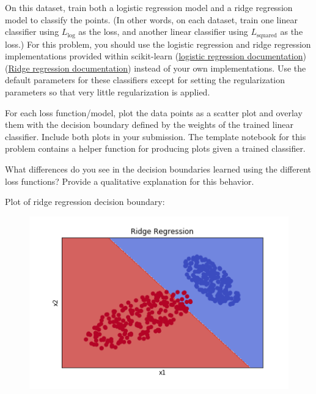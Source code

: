 On this dataset, train both a logistic regression model and a ridge regression model to classify the points.  (In other words, on each dataset, train one linear classifier using $L_\text{log}$ as the loss, and another linear classifier using $L_\text{squared}$ as the loss.) For this problem, you should use the logistic regression and ridge regression implementations provided within scikit-learn
(\href{http://scikit-learn.org/stable/modules/generated/sklearn.linear_model.LogisticRegression.html}{logistic regression documentation})
(\href{http://scikit-learn.org/stable/modules/generated/sklearn.linear_model.Ridge.html}{Ridge regression documentation})
instead of your own implementations. Use the default parameters for these classifiers except for setting the regularization parameters so that very little regularization is applied.

For each loss function/model, plot the data points as a scatter plot and overlay them with the decision boundary defined by the weights of the trained linear classifier.  Include both plots in your submission. The template notebook for this problem contains a helper function for producing plots given a trained classifier.

What differences do you see in the decision boundaries learned using the different loss functions? Provide a qualitative explanation for this behavior.

Plot of ridge regression decision boundary:
\noindent
\begin{figure}[H]
\centering
\includegraphics[scale=0.6]{1b_plot_ridge.png}
\end{figure}
\noindent

